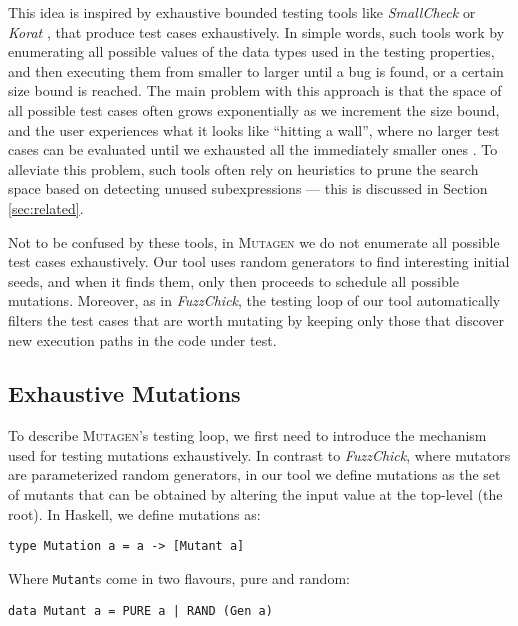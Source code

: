 \documentclass[sigconf, anonymous]{acmart}
\newcommand{\fuzzchick}{\textit{FuzzChick}\xspace}
\newcommand{\mutagen}{\textsc{Mutagen}\xspace}
\begin{document}
This idea is inspired by exhaustive bounded testing tools like \emph{SmallCheck}
\cite{runciman2008smallcheck} or \emph{Korat} \cite{boyapati2002korat}, that
produce test cases exhaustively.
%
In simple words, such tools work by enumerating all possible values of the data
types used in the testing properties, and then executing them from smaller to
larger until a bug is found, or a certain size bound is reached.
%
The main problem with this approach is that the space of all possible test cases
often grows exponentially as we increment the size bound, and the user
experiences what it looks like ``hitting a wall'', where no larger test cases
can be evaluated until we exhausted all the immediately smaller ones
\cite{DuregardJW12}.
%
To alleviate this problem, such tools often rely on heuristics to prune the
search space based on detecting unused subexpressions --- this is discussed in
Section \ref{sec:related}.



Not to be confused by these tools, in \mutagen we do not enumerate all possible
test cases exhaustively.
%
Our tool uses random generators to find interesting initial seeds, and when it
finds them, only then proceeds to schedule all possible mutations.
%
Moreover, as in \fuzzchick, the testing loop of our tool automatically filters
the test cases that are worth mutating by keeping only those that discover new
execution paths in the code under test.


\subsection{Exhaustive Mutations}

To describe \mutagen's testing loop, we first need to introduce the mechanism
used for testing mutations exhaustively.
%
In contrast to \fuzzchick, where mutators are parameterized random generators,
in our tool we define mutations as the set of mutants that can be obtained by
altering the input value at the top-level (the root).
%
In Haskell, we define mutations as:

\begin{verbatim}
type Mutation a = a -> [Mutant a]
\end{verbatim}

\noindent Where \texttt{Mutant}s come in two flavours, pure and random:

\begin{verbatim}
data Mutant a = PURE a | RAND (Gen a)
\end{verbatim}
\end{document}

